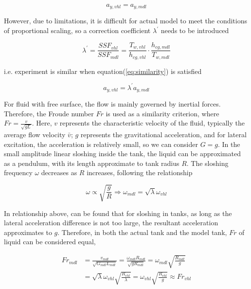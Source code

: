 \vspace{-0.3cm}
\begin{equation}
a_{y,vhl} = a_{y,mdl}
\end{equation}

However, due to limitations, it is difficult for actual model to meet the conditions of proportional scaling, so a correction coefficient $
\lambda^{'}$ needs to be introduced

\vspace{-0.3cm}
\begin{equation}
\lambda^{'} = \frac{SSF_{vhl}}{SSF_{mdl}} = \frac{T_{w,vhl}}{h_{cg,vhl}} \cdot \frac{h_{cg,mdl}}{T_{w,mdl}}
\end{equation}

i.e. experiment is similar when equation(\ref{eq:similarity}) is satisfied

\vspace{-0.3cm}
\begin{equation}
a_{y,vhl} = \lambda^{'}a_{y,mdl}
\label{eq:similarity}
\end{equation}

For fluid with free surface, the flow is mainly governed by inertial forces. Therefore, the Froude number $Fr$ is used as a similarity criterion, where $Fr = \frac{v}{\sqrt{gL}}$. Here, $v$ represents the characteristic velocity of the fluid, typically the average flow velocity $\bar{v}$; $g$ represents the gravitational acceleration, and for lateral excitation, the acceleration is relatively small, so we can consider $G=g$. In the small amplitude linear sloshing inside the tank, the liquid can be approximated as a pendulum, with its length approximate to tank radius $R$. The sloshing frequency $\omega$ decreases as $R$ increases, following the relationship

\vspace{-0.3cm}
\begin{equation}
\left. \omega \propto \sqrt{\frac{g}{R}}\Rightarrow\omega_{mdl} = \sqrt{\lambda}\omega_{vhl} \right.
\end{equation}

In relationship above, can be found that for sloshing in tanks, as long as the lateral acceleration difference is not too large, the resultant acceleration approximates to $g$. Therefore, in both the actual tank and the model tank, $Fr$ of liquid can be considered equal,

\vspace{-0.5cm}
\begin{equation}
\begin{split}
Fr_{mdl} &= \frac{v_{mdl}}{\sqrt{G_{mdl}L_{mdl}}} = \frac{\omega_{mdl}R_{mdl}}{\sqrt{gR_{mdl}}} 
= \omega_{mdl}\sqrt{\frac{R_{mdl}}{g}}\\ &= \sqrt{\lambda}\omega_{vhl}\sqrt{\frac{R_{vhl}}{\lambda}} = \omega_{vhl}\sqrt{\frac{R_{vhl}}{g}} \approx Fr_{vhl}
\end{split}
\end{equation}

